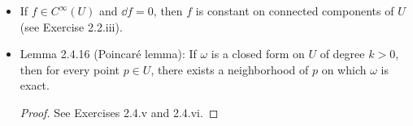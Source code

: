 \documentclass[../notes.tex]{subfiles}
\begin{document}
\begin{itemize}
\begin{itemize}
\begin{itemize}
        \end{itemize}
    \end{itemize}
    \item If $f\in C^\infty(U)$ and $\dd f=0$, then $f$ is constant on connected components of $U$ (see Exercise 2.2.iii).
    \item Lemma 2.4.16 (Poincar\'{e} lemma): If $\omega$ is a closed form on $U$ of degree $k>0$, then for every point $p\in U$, there exists a neighborhood of $p$ on which $\omega$ is exact.
    \begin{proof}
        See Exercises 2.4.v and 2.4.vi.
    \end{proof}
\end{itemize}
\end{document}
